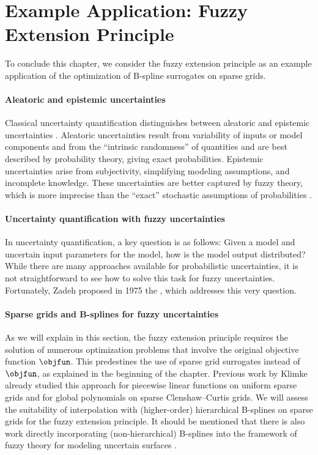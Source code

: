 \section{Example Application: Fuzzy Extension Principle}
\label{sec:54fuzzy}

To conclude this chapter, we consider the fuzzy extension principle
as an example application of the optimization of B-spline surrogates
on sparse grids.

\paragraph{Aleatoric and epistemic uncertainties}

Classical uncertainty quantification distinguishes between
aleatoric and epistemic uncertainties \cite{Walz16Fuzzy}.
Aleatoric uncertainties result from variability of inputs or
model components and from the ``intrinsic randomness''
of quantities and are best described by probability theory,
giving exact probabilities.
Epistemic uncertainties arise from subjectivity,
simplifying modeling assumptions, and incomplete knowledge.
These uncertainties are better captured by fuzzy theory,
which is more imprecise than the ``exact'' stochastic assumptions
of probabilities \cite{Walz16Fuzzy}.

\paragraph{Uncertainty quantification with fuzzy uncertainties}

In uncertainty quantification, a key question is as follows:
Given a model and uncertain input parameters for the model,
how is the model output distributed?
While there are many approaches available
for probabilistic uncertainties,
it is not straightforward to see how to solve this task
for fuzzy uncertainties.
Fortunately, Zadeh proposed in 1975
the  \cite{Zadeh75Concept},
which addresses this very question.

\paragraph{Sparse grids and B-splines for fuzzy uncertainties}

As we will explain in this section,
the fuzzy extension principle requires the solution of numerous
optimization problems that involve the original objective function
$\objfun$.
This predestines the use of sparse grid surrogates instead of
$\objfun$, as explained in the beginning of the chapter.
Previous work by Klimke \cite{Klimke06Uncertainty} already
studied this approach for piecewise linear functions on uniform sparse grids
and for global polynomials on sparse Clenshaw--Curtis grids.
We will assess the suitability of interpolation with (higher-order)
hierarchical B-splines on sparse grids for the fuzzy extension principle.
It should be mentioned that there is also work
directly incorporating (non-hierarchical) B-splines
into the framework of fuzzy theory for modeling uncertain surfaces
.



